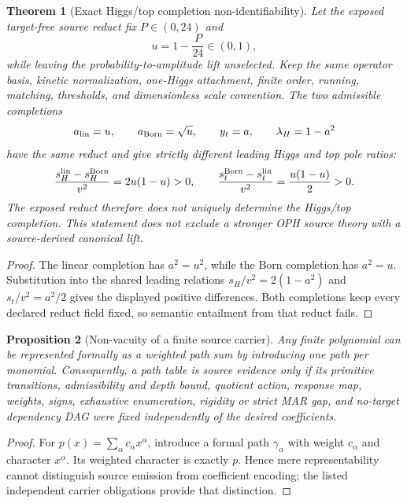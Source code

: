 \documentclass[11pt]{article}
\newtheorem{theorem}{Theorem}[section]
\newtheorem{proposition}[theorem]{Proposition}
\begin{document}
\begin{theorem}[Exact Higgs/top completion non-identifiability]
\label{thm:higgs-top-two-completion-no-go}
Let the exposed target-free source reduct fix \(P\in(0,24)\) and
\[
u=1-\frac{P}{24}\in(0,1),
\]
while leaving the probability-to-amplitude lift unselected. Keep the same
operator basis, kinetic normalization, one-Higgs attachment, finite order,
running, matching, thresholds, and dimensionless scale convention. The two
admissible completions
\[
a_{\rm lin}=u,\qquad a_{\rm Born}=\sqrt u,
\qquad y_t=a,\qquad \lambda_H=1-a^2
\]
have the same reduct and give strictly different leading Higgs and top pole
ratios:
\[
\frac{s_H^{\rm lin}-s_H^{\rm Born}}{v^2}=2u(1-u)>0,
\qquad
\frac{s_t^{\rm Born}-s_t^{\rm lin}}{v^2}=\frac{u(1-u)}2>0.
\]
The exposed reduct therefore does not uniquely determine the Higgs/top
completion. This statement does not exclude a stronger OPH source theory with
a source-derived canonical lift.
\end{theorem}

\begin{proof}
The linear completion has \(a^2=u^2\), while the Born completion has
\(a^2=u\). Substitution into the shared leading relations
\(s_H/v^2=2(1-a^2)\) and \(s_t/v^2=a^2/2\) gives the displayed positive
differences. Both completions keep every declared reduct field fixed, so
semantic entailment from that reduct fails.
\end{proof}

\begin{proposition}[Non-vacuity of a finite source carrier]
Any finite polynomial can be represented formally as a weighted path sum by
introducing one path per monomial. Consequently, a path table is source
evidence only if its primitive transitions, admissibility and depth bound,
quotient action, response map, weights, signs, exhaustive enumeration,
rigidity or strict MAR gap, and no-target dependency DAG were fixed
independently of the desired coefficients.
\end{proposition}

\begin{proof}
For $p(x)=\sum_\alpha c_\alpha x^\alpha$, introduce a formal path
\(\gamma_\alpha\) with weight $c_\alpha$ and character $x^\alpha$. Its
weighted character is exactly $p$. Hence mere representability cannot
distinguish source emission from coefficient encoding; the listed independent
carrier obligations provide that distinction.
\end{proof}
\end{document}
